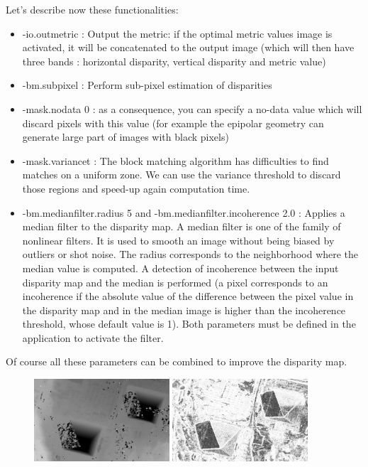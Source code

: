Let's describe now these functionalities:

\begin{itemize}
\item -io.outmetric : Output the metric: if the optimal metric values image is
  activated, it will be concatenated to the output image (which will then
  have three bands : horizontal disparity, vertical disparity and metric value)
\item -bm.subpixel : Perform sub-pixel estimation of disparities
\item -mask.nodata 0 : as a consequence, you can specify a no-data value which
  will discard pixels with this value (for example the epipolar geometry can
  generate large part of images with black pixels)
\item -mask.variancet : The block matching algorithm has difficulties to find
  matches on a uniform zone. We can use the variance threshold to discard those
  regions and speed-up again computation time.
\item -bm.medianfilter.radius 5 and -bm.medianfilter.incoherence 2.0 : Applies a
  median filter to the disparity map. A median filter is one of the family of
  nonlinear filters. It is used to smooth an image without being biased by
  outliers or shot noise. The radius corresponds to the neighborhood where the
  median value is computed. A detection of incoherence between the input
  disparity map and the median is performed (a pixel corresponds to an
  incoherence if the absolute value of the difference between the pixel value in
  the disparity map and in the median image is higher than the incoherence
  threshold, whose default value is 1). Both parameters must be defined in the
  application to activate the filter.
\end{itemize}

Of course all these parameters can be combined to improve the disparity map.

\begin{figure}[!h]
  \center
  \includegraphics[width=0.45\textwidth]{../Art/MonteverdiImages/stereo_disparity_horizontal.png}
  \includegraphics[width=0.45\textwidth]{../Art/MonteverdiImages/stereo_disparity_metric.png}
  \label{fig:EpipolarImages}
\end{figure}

